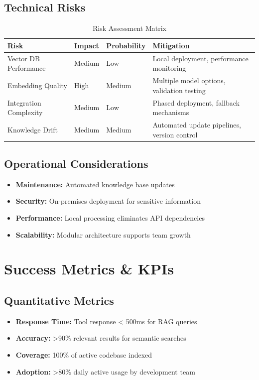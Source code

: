 \documentclass[11pt,letterpaper]{article}
\begin{document}
\subsection{Technical Risks}
\begin{table}[h!]
\centering
\begin{tabularx}{\textwidth}{|l|X|l|X|}
\hline
\textbf{Risk} & \textbf{Impact} & \textbf{Probability} & \textbf{Mitigation} \\
\hline
Vector DB Performance & Medium & Low & Local deployment, performance monitoring \\
\hline
Embedding Quality & High & Medium & Multiple model options, validation testing \\
\hline
Integration Complexity & Medium & Low & Phased deployment, fallback mechanisms \\
\hline
Knowledge Drift & Medium & Medium & Automated update pipelines, version control \\
\hline
\end{tabularx}
\caption{Risk Assessment Matrix}
\end{table}

\subsection{Operational Considerations}
\begin{itemize}
    \item \textbf{Maintenance:} Automated knowledge base updates
    \item \textbf{Security:} On-premises deployment for sensitive information
    \item \textbf{Performance:} Local processing eliminates API dependencies
    \item \textbf{Scalability:} Modular architecture supports team growth
\end{itemize}

\section{Success Metrics \& KPIs}

\subsection{Quantitative Metrics}
\begin{itemize}
    \item \textbf{Response Time:} Tool response < 500ms for RAG queries
    \item \textbf{Accuracy:} >90\% relevant results for semantic searches
    \item \textbf{Coverage:} 100\% of active codebase indexed
    \item \textbf{Adoption:} >80\% daily active usage by development team
\end{itemize}
\end{document}
